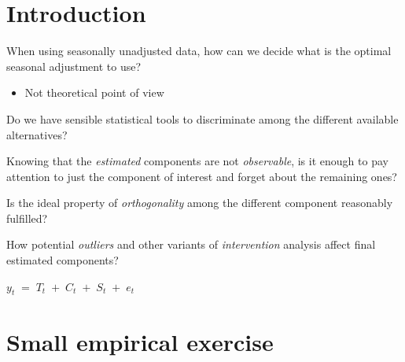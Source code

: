 
 \section{Introduction}
\begin{slide}
  \begin{wideitemize}
  \item <1> When using seasonally unadjusted data, how can we decide what
    is the optimal seasonal adjustment to use?%
    \begin{itemize}
    \item Not theoretical point of view
    \end{itemize}
    
  \item<2> Do we have sensible statistical tools to discriminate among
    the different available alternatives?%
  \item<2> Knowing that the \emph{estimated} components are not
    \emph{observable}, is it enough to pay attention to just the
    component of interest and forget about the remaining ones?%
  \item<2> Is the ideal property of \emph{orthogonality} among the
    different component reasonably fulfilled?
  \item<3> How potential \emph{outliers} and other variants of
    \emph{intervention} analysis affect final estimated components?
  \end{wideitemize}
\end{slide}

\begin{slide}
  
  \begin{center}
    \LARGE
    \begin{math}
      y_t\;=\;T_t\;+\;C_t\;+\;S_t\;+\;e_t %
    \end{math}
  \end{center}
  
\end{slide}



\section[Exercise]{Small empirical exercise}


